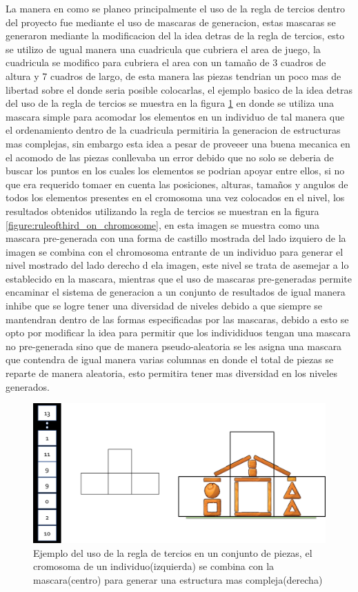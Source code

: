La manera en como se planeo principalmente el uso de la regla de tercios dentro
del proyecto fue mediante el uso de mascaras de generacion, estas mascaras se
generaron mediante la modificacion del la idea detras de la regla de tercios,
esto se utilizo de ugual manera una cuadricula que cubriera el area de juego, la
cuadricula se modifico para cubriera el area con un tamaño de 3 cuadros de
altura y 7 cuadros de largo, de esta manera las piezas tendrian un poco mas de
libertad sobre el donde seria posible colocarlas, el ejemplo basico de la idea
detras del uso de la regla de tercios se muestra en la figura
\ref{figure:ruleofthird_on_pieces} en donde se utiliza una mascara simple para
acomodar los elementos en un individuo de tal manera que el ordenamiento dentro
de la cuadricula permitiria la generacion de estructuras mas complejas, sin
embargo esta idea a pesar de proveeer una buena mecanica en el acomodo de las
piezas conllevaba un error debido que no solo se deberia de buscar los puntos en
los cuales los elementos se podrian apoyar entre ellos, si no que era requerido
tomaer en cuenta las posiciones, alturas, tamaños y angulos de todos los
elementos presentes en el cromosoma una vez colocados en el nivel, los
resultados obtenidos utilizando la regla de tercios se muestran en la figura
\ref{figure:ruleofthird_on_chromosome}, en esta imagen se muestra como una
mascara pre-generada con una forma de castillo mostrada del lado izquiero de la
imagen se combina con el chromosoma entrante de un individuo para generar el
nivel mostrado del lado derecho d ela imagen, este nivel se trata de asemejar a
lo establecido en la mascara, mientras que el uso de mascaras pre-generadas
permite encaminar el sistema de generacion a un conjunto de resultados de igual
manera inhibe que se logre tener una diversidad de niveles debido a que siempre
se mantendran dentro de las formas especificadas por las mascaras, debido a esto
se opto por modificar la idea para permitir que los individiduos tengan una
mascara no pre-generada sino que de manera pseudo-aleatoria se les asigna una
mascara que contendra de igual manera varias columnas en donde el total de
piezas se reparte de manera aleatoria, esto permitira tener mas diversidad en
los niveles generados.

\begin{figure}
  \centering
  \includegraphics[width=1.0\textwidth]{img/chromosome_thirds.png}
  \caption{Ejemplo del uso de la regla de tercios en un conjunto de piezas, el cromosoma de un individuo(izquierda) se combina con la mascara(centro) para generar una estructura mas compleja(derecha)}
  \label{figure:ruleofthird_on_pieces}
\end{figure}


